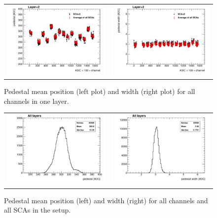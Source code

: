 \documentclass[a4paper,11pt]{article}
\begin{document}
\begin{figure}[!t]
  \centering
  \begin{tabular}{ll}
    \includegraphics[width=2.8in]{ped_mean_layer2-eps-converted-to.pdf} & \includegraphics[width=2.8in]{width_mean_layer2-eps-converted-to.pdf}
  \end{tabular}
  \caption{Pedestal mean position (left plot) and width (right plot) for all channels in one layer.}
\label{pedestal_layer}
\end{figure}

\begin{figure}[!t]
  \centering
  \begin{tabular}{ll}
    \includegraphics[width=2.8in]{h_ped_mean-eps-converted-to.pdf} & \includegraphics[width=2.8in]{h_ped_width-eps-converted-to.pdf}
  \end{tabular}
  \caption{Pedestal mean position (left) and width (right) for all channels and all SCAs in the setup.}
\label{pedestal_all}
\end{figure}
\end{document}
